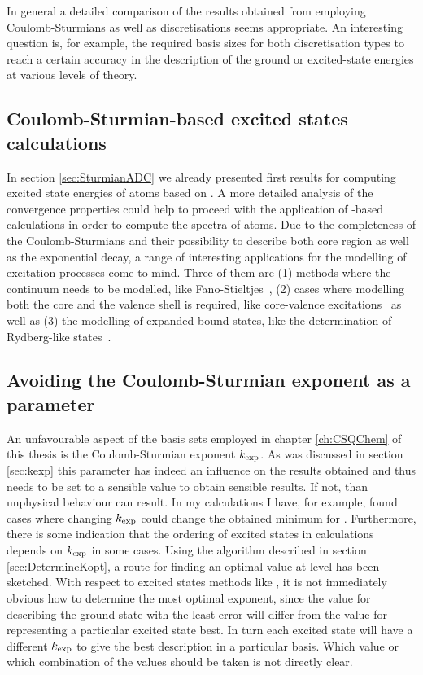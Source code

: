 In general a detailed comparison of the results obtained
from employing Coulomb-Sturmians as well as \cGTO discretisations seems appropriate.
An interesting question is, for example, the required basis sizes for both
discretisation types to reach a certain accuracy
in the description of the ground or excited-state energies
at various levels of theory.

\subsection{Coulomb-Sturmian-based excited states calculations}
In section \vref{sec:SturmianADC} we already presented
first results for computing excited state energies of atoms based on \ADC.
A more detailed analysis of the convergence properties
could help to proceed with the application of \CS-based \ADC
calculations in order to compute the spectra of atoms.
Due to the completeness of the Coulomb-Sturmians
and their possibility to describe both core region as well as
the exponential decay,
a range of interesting applications for the modelling
of excitation processes come to mind.
Three of them are 
(1) methods where the continuum needs to be modelled,
like Fano-Stieltjes~\cite{Feshbach1958,Feshbach1962,Santra2002},
(2) cases where modelling both the core and the valence shell is required,
like core-valence excitations~\cite{Wenzel2014,Wenzel2016}
as well as
(3) the modelling of expanded bound states,
like the determination of Rydberg-like states~\cite{Kaufmann1989,Riss1993}.

\subsection{Avoiding the Coulomb-Sturmian exponent as a parameter}
An unfavourable aspect of the \CS basis sets
employed in chapter \ref{ch:CSQChem} of this thesis is
the Coulomb-Sturmian exponent $k_\text{exp}$.
As was discussed in section \ref{sec:kexp}
this parameter has indeed an influence on the results obtained
and thus needs to be set to a sensible value to obtain sensible results.
If not, than unphysical behaviour can result.
In my calculations I have, for example, found cases
where changing $k_\text{exp}$ could change the obtained \SCF minimum
for \HF.
Furthermore, there is some indication
that the ordering of excited states in \ADC calculations
depends on $k_\text{exp}$ in some cases.
Using the algorithm described in section \ref{sec:DetermineKopt},
a route for finding an optimal value at \HF level has been sketched.
With respect to excited states methods like \ADC,
it is not immediately obvious how to determine the most optimal exponent,
since the value for describing the ground state with the least error
will differ from the value for representing a particular excited state best.
In turn each excited state will have a different $k_\text{exp}$
to give the best description in a particular \CS basis.
Which value or which combination of the values should be taken
is not directly clear.

